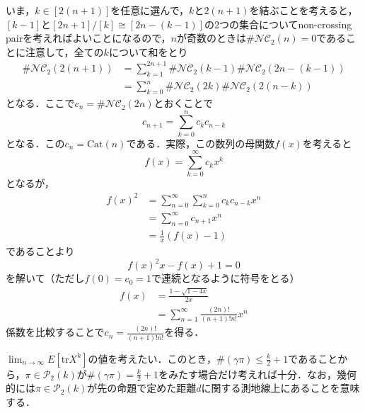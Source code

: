 \documentclass{ltjsarticle}
\makeatletter
\theoremstyle{mystyle1}
\theoremstyle{mystyle2}
\theoremstyle{mystyle3}
\renewenvironment{proof}[1][\proofname]{\par
  \pushQED{\qed}%
  \normalfont
  \topsep6\p@\@plus6\p@ \trivlist
  \item[\hskip\labelsep{\bfseries\sffamily #1}]\ignorespaces
}{%
  \popQED\endtrivlist\@endpefalse
}
\renewcommand\proofname{証明}
\makeatother
\begin{document}
\begin{proof}
    いま，$k\in[2(n+1)]$を任意に選んで，$k$と$2(n+1)$を結ぶことを考えると，$[k-1]$と$[2n+1]/[k]\cong [2n-(k-1)]$の2つの集合についてnon-crossing pairを考えればよいことになるので，$n$が奇数のときは$\#\mathcal{NC}_2(n)=0$であることに注意して，全ての$k$について和をとり
    \begin{equation}
        \begin{split}
            \#\mathcal{NC}_2(2(n+1)) & =\sum_{k=1}^{2n+1}\#\mathcal{NC}_2(k-1)\#\mathcal{NC}_2(2n-(k-1)) \\
            & =\sum_{k=0}^{n}\#\mathcal{NC}_2(2k)\#\mathcal{NC}_2(2(n-k))
        \end{split}
    \end{equation}
    となる．ここで$c_{n}=\#\mathcal{NC}_2(2n)$とおくことで
    \begin{equation}
        c_{n+1}=\sum_{k=0}^n c_kc_{n-k}
    \end{equation}
    となる．この$c_n=\mathrm{Cat}(n)$である．実際，この数列の母関数$f(x)$を考えると
    \begin{equation}
        f(x)=\sum_{k=0}^\infty c_kx^k
    \end{equation}
    となるが，
    \begin{equation}
        \begin{split}
            f(x)^2 & =\sum_{n=0}^\infty\sum_{k=0}^n c_kc_{n-k} x^n \\
            & =\sum_{n=0}^\infty c_{n+1}x^n                 \\
            & =\frac{1}{x}(f(x)-1)
        \end{split}
    \end{equation}
    であることより
    \begin{equation}
        f(x)^2x-f(x)+1=0
    \end{equation}
    を解いて（ただし$f(0)=c_0=1$で連続となるように符号をとる）
    \begin{equation}
        \begin{split}
            f(x) & =\frac{1-\sqrt{1-4x}}{2x}                    \\
            & =\sum_{n=1}^\infty \frac{(2n)!}{(n+1)!n!}x^n
        \end{split}
    \end{equation}
    係数を比較することで$c_n=\frac{(2n)!}{(n+1)!n!}$を得る．

\end{proof}

$\lim_{n\to\infty}E[\mathrm{tr} X^k]$の値を考えたい．このとき，$\#(\gamma\pi)\leq \frac{k}{2}+1$であることから，$\pi\in\mathcal{P}_2(k)$が$\#(\gamma\pi)= \frac{k}{2}+1$をみたす場合だけ考えれば十分．なお，幾何的には$\pi\in\mathcal{P}_2(k)$が先の命題で定めた距離$d$に関する測地線上にあることを意味する．
\end{document}
